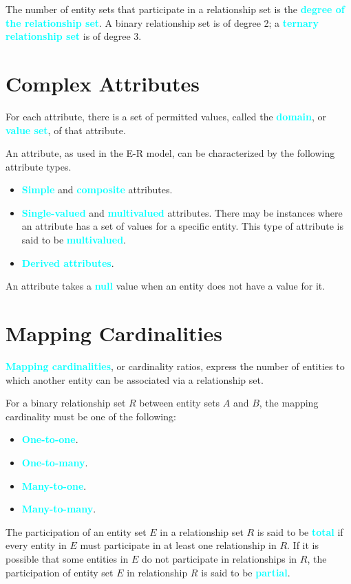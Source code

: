 \documentclass[a4paper,12pt,twoside,openany]{book}
\newcommand{\textcy}[1]{\textbf{\textcolor{cyan}{#1}}}
\begin{document}
The number of entity sets that participate in a relationship set is the \textcy{degree of the relationship set}. A binary relationship set is of degree 2; a \textcy{ternary relationship set} is of degree 3.

\section{Complex Attributes}

For each attribute, there is a set of permitted values, called the \textcy{domain}, or \textcy{value set}, of that attribute.

An attribute, as used in the E-R model, can be characterized by the following attribute types.
\begin{itemize}
    \item\textcy{Simple} and \textcy{composite} attributes.
    \item\textcy{Single-valued} and \textcy{multivalued} attributes. There may be instances where an attribute has a set of values for a specific entity. This type of attribute is said to be \textcy{multivalued}.
    \item\textcy{Derived attributes}.
\end{itemize}

An attribute takes a \textcy{null} value when an entity does not have a value for it.

\section{Mapping Cardinalities}

\textcy{Mapping cardinalities}, or cardinality ratios, express the number of entities to which another entity can be associated via a relationship set.

For a binary relationship set $R$ between entity sets $A$ and $B$, the mapping cardinality must be one of the following:
\begin{itemize}
    \item \textcy{One-to-one}.
    \item \textcy{One-to-many}.
    \item \textcy{Many-to-one}.
    \item \textcy{Many-to-many}.
\end{itemize}

The participation of an entity set $E$ in a relationship set $R$ is said to be \textcy{total} if every entity in $E$ must participate in at least one relationship in $R$. If it is possible that some entities in $E$ do not participate in relationships in $R$, the participation of entity set $E$ in relationship $R$ is said to be \textcy{partial}.
\end{document}

